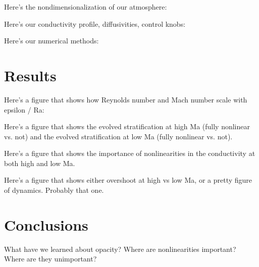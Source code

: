 \documentclass[twocolumn]{aastex62}
\begin{document}
Here's the nondimensionalization of our atmosphere:

Here's our conductivity profile, diffusivities, control knobs:

Here's our numerical methods:


\section{Results} \label{sec:results}
Here's a figure that shows how Reynolds number and Mach number
scale with epsilon / Ra:

Here's a figure that shows the evolved stratification at high Ma
(fully nonlinear vs. not) and the evolved stratification at low Ma
(fully nonlinear vs. not). 

Here's a figure that shows the importance of nonlinearities in
the conductivity at both high and low Ma.

Here's a figure that shows either overshoot at high vs low Ma, or
a pretty figure of dynamics. Probably that one.

\section{Conclusions} \label{sec:conclusions}
What have we learned about opacity? Where are nonlinearities important?
Where are they unimportant?



\end{document}
